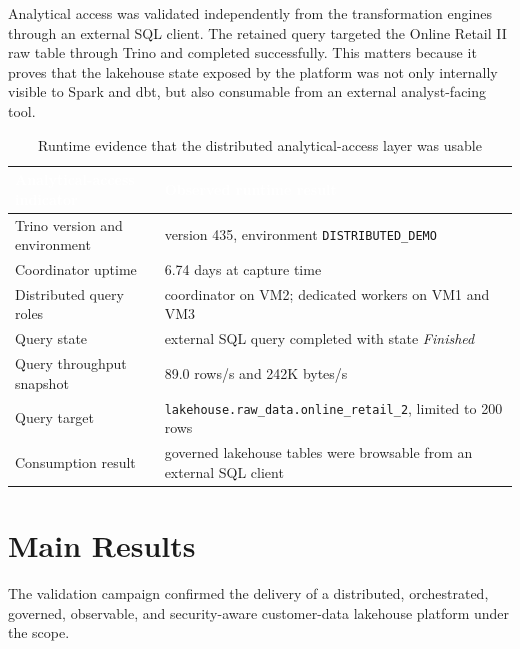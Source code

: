 Analytical access was validated independently from the transformation engines through an external SQL client. The retained query targeted the Online Retail II raw table through Trino and completed successfully. This matters because it proves that the lakehouse state exposed by the platform was not only internally visible to Spark and dbt, but also consumable from an external analyst-facing tool.

\begin{table}[!htbp]
    \centering
    \footnotesize
    \renewcommand{\arraystretch}{1.14}
    \begin{tabularx}{\textwidth}{|L{0.36\textwidth}|Y|}
        \hline
        \textcolor{white}{\textbf{Analytical-access indicator}} & \textcolor{white}{\textbf{Observed runtime result}} \\
        \hline
        Trino version and environment & version 435, environment \texttt{DISTRIBUTED\_DEMO} \\
        \hline
        Coordinator uptime & 6.74 days at capture time \\
        \hline
        Distributed query roles & coordinator on VM2; dedicated workers on VM1 and VM3 \\
        \hline
        Query state & external SQL query completed with state \textit{Finished} \\
        \hline
        Query throughput snapshot & 89.0 rows/s and 242K bytes/s \\
        \hline
        Query target & \texttt{lakehouse.raw\_data.online\_retail\_2}, limited to 200 rows \\
        \hline
        Consumption result & governed lakehouse tables were browsable from an external SQL client \\
        \hline
    \end{tabularx}
    \caption{Runtime evidence that the distributed analytical-access layer was usable}
    \label{tab:chapter8-trino-query-evidence}
\end{table}
\FloatBarrier

\section{Main Results}
The validation campaign confirmed the delivery of a distributed, orchestrated, governed, observable, and security-aware customer-data lakehouse platform under the \projectname{} scope.

